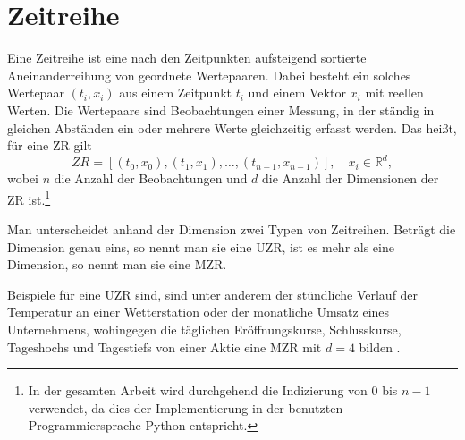 \section{Zeitreihe}
Eine Zeitreihe ist eine nach den Zeitpunkten aufsteigend sortierte Aneinanderreihung von geordnete Wertepaaren. Dabei besteht ein solches Wertepaar $(t_i, x_i)$ aus einem Zeitpunkt $t_i$ und einem Vektor $x_i$ mit reellen Werten. Die Wertepaare sind Beobachtungen einer Messung, in der ständig in gleichen Abständen ein oder mehrere Werte gleichzeitig erfasst werden. Das heißt, für eine \ac{ZR} gilt 
\[ZR=[(t_0,x_0),(t_1,x_1),\ldots,(t_{n-1},x_{n-1})], \quad x_i \in \mathbb{R}^d,\]
wobei $n$ die Anzahl der Beobachtungen und $d$ die Anzahl der Dimensionen der \acs{ZR} ist.\footnote{In der gesamten Arbeit wird durchgehend die Indizierung von 0 bis $n-1$ verwendet, da dies der Implementierung in der benutzten Programmiersprache Python entspricht.}\label{foot:indexe}

Man unterscheidet anhand der Dimension zwei Typen von Zeitreihen. Beträgt die Dimension genau eins, so nennt man sie eine \ac{UZR}, ist es mehr als eine Dimension, so nennt man sie eine \ac{MZR}.

Beispiele für eine \acs{UZR} sind, sind unter anderem der stündliche Verlauf der Temperatur an einer Wetterstation oder der monatliche Umsatz eines Unternehmens, wohingegen die täglichen Eröffnungskurse, Schlusskurse, Tageshochs und Tagestiefs von einer Aktie eine \acs{MZR} mit $d=4$ bilden \cite[Ch. 3.1]{gc2023}.